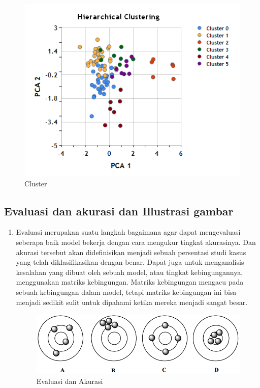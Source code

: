 \begin{enumerate}
\begin{figure}[ht]
\centering
\includegraphics[scale=0.5]{figures/4mrdt.png}
\caption{Cluster}
\label{contoh}
\end{figure}
\end{enumerate}

\subsection{Evaluasi dan akurasi dan Illustrasi gambar}
\begin{enumerate}
\item Evaluasi merupakan suatu langkah bagaimana agar dapat mengevaluasi seberapa baik model bekerja dengan cara mengukur tingkat akurasinya. Dan akurasi tersebut akan didefinisikan menjadi sebuah persentasi studi kasus yang telah diklasifikasikan dengan benar. Dapat juga untuk menganalisis kesalahan yang dibuat oleh sebuah model, atau tingkat kebingungannya, menggunakan matriks kebingungan. Matriks kebingungan mengacu pada sebuah kebingungan dalam model, tetapi matriks kebingungan ini bisa menjadi sedikit sulit untuk dipahami ketika mereka menjadi sangat besar.
\begin{figure}[ht]
\centering
\includegraphics[scale=0.5]{figures/5mrdt.png}
\caption{ Evaluasi dan Akurasi}
\label{contoh}
\end{figure}
\end{enumerate}

